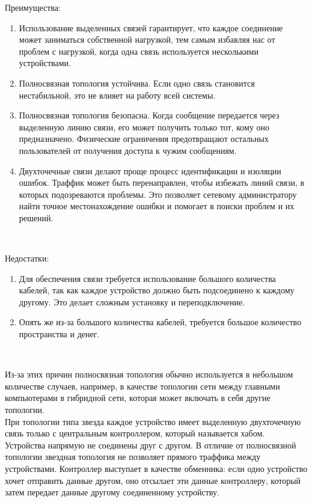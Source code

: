 Преимущества: \\
\begin{enumerate}
  \item Использование выделенных связей гарантирует, что каждое соединение может заниматься собственной нагрузкой, тем самым избавляя нас от проблем с нагрузкой, когда одна связь используется несколькими устройствами.
  \item Полносвязная топология устойчива. Если одно связь становится нестабильной, это не влияет на работу всей системы. 
  \item Полносвязная топология безопасна. Когда сообщение передается через выделенную линию связи, его может получить только тот, кому оно предназначено. Физические ограничения предотвращают остальных пользователей от получения доступа к чужим сообщениям. 
  \item Двухточечные связи делают проще процесс идентификации и изоляции ошибок. Траффик может быть перенаправлен, чтобы избежать линий связи, в которых подозреваются проблемы. Это позволяет сетевому администратору найти точное местонахождение ошибки и помогает в поиски проблем и их решений.
\end{enumerate}
\

Недостатки: \\
\begin{enumerate}
  \item Для обеспечения связи требуется использование большого количества кабелей, так как каждое устройство должно быть подсоединено к каждому другому. Это делает сложным установку и переподключение.
  \item Опять же из-за большого количества кабелей, требуется большое количество пространства и денег.
\end{enumerate}
\

Из-за этих причин полносвязная топология обычно используется в небольшом количестве случаев, например, в качестве топологии сети между главными компьютерами в гибридной сети, которая может включать в себя другие топологии. \\

При топологии типа звезда каждое устройство имеет выделенную двухточечную связь только с центральным контроллером, который называется хабом. Устройства напрямую не соединены друг с другом. В отличие от полносвязной топологии звездная топология не позволяет прямого траффика между устройствами. Контроллер выступает в качестве обменника: если одно устройство хочет отправить данные другом, оно отсылает эти данные контроллеру, который затем передает данные другому соединенному устройству. \\


